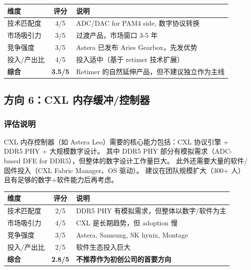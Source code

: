 \documentclass[11pt,a4paper]{ctexart}
\begin{document}
\begin{table}[htb]
    \centering
    \begin{tabular}{l c p{}}
        \toprule
        \textbf{维度} & \textbf{评分} & \textbf{说明} \\
        \midrule
        技术匹配度 & 4/5 & ADC/DAC for PAM4 side, 数字协议转换 \\
        市场吸引力 & 3/5 & 过渡产品，市场窗口 3-5 年 \\
        竞争强度 & 3/5 & Astera 已发布 Aries Gearbox，先发优势 \\
        投入/产出比 & 4/5 & 投入适中（基于 retimer 技术扩展） \\
        \midrule
        \rowcolor{highlight}
        \textbf{综合} & \textbf{3.5/5} & Retimer 的自然延伸产品，但不建议独立作为主线 \\
        \bottomrule
    \end{tabular}
\end{table}

\subsection{方向 6：CXL 内存缓冲/控制器}

\subsubsection{评估说明}
CXL 内存控制器（如 Astera Leo）需要的核心能力包括：CXL 协议引擎 + DDR5 PHY + 大规模数字设计。
其中 DDR5 PHY 部分有模拟需求（ADC-based DFE for DDR5），但整体的数字设计工作量巨大。
此外还需要大量的软件/固件投入（CXL Fabric Manager、OS 驱动）。
建议在团队规模扩大（300+ 人）且有足够的数字+软件能力后再考虑。

\begin{table}[htb]
    \centering
    \begin{tabular}{l c p{}}
        \toprule
        \textbf{维度} & \textbf{评分} & \textbf{说明} \\
        \midrule
        技术匹配度 & 2/5 & DDR5 PHY 有模拟需求，但整体以数字/软件为主 \\
        市场吸引力 & 4/5 & CXL 是长期趋势，但 adoption 慢 \\
        竞争强度 & 3/5 & Astera, Samsung, SK hynix, Montage \\
        投入/产出比 & 2/5 & 软件生态投入巨大 \\
        \midrule
        \rowcolor{red!8}
        \textbf{综合} & \textbf{2.8/5} & \textbf{不推荐作为初创公司的首要方向} \\
        \bottomrule
    \end{tabular}
\end{table}
\end{document}
